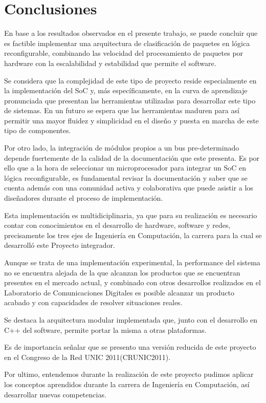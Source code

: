 \chapter{Conclusiones}


En base a los resultados observados en el presente trabajo, se puede concluir que es factible implementar una arquitectura de clasificación de paquetes en lógica reconfigurable, combinando las velocidad del procesamiento de paquetes por hardware con la escalabilidad y estabilidad que permite el software. 

Se considera que la complejidad de este tipo de proyecto reside especialmente en la implementación del SoC y, más específicamente, en la curva de aprendizaje pronunciada que presentan las herramientas utilizadas para desarrollar este tipo de sistemas. En un futuro se espera que las herramientas maduren para así permitir una mayor fluidez y simplicidad en el diseño y puesta en marcha de este tipo de componentes. 

Por otro lado, la integración de módulos propios a un bus pre-determinado depende fuertemente de la calidad de la documentación que este presenta. Es por ello que a la hora de seleccionar un microprocesador para integrar un SoC en lógica reconfigurable, es fundamental revisar la documentación y saber que se cuenta además con una comunidad activa y colaborativa que puede asistir a los diseñadores durante el proceso de implementación. 

Esta implementación es multidiciplinaria, ya que para su realización es necesario contar con conocimientos en el desarrollo de hardware, software y  redes, precisamente los tres ejes de Ingeniería en Computación, la carrera para la cual se desarrolló este Proyecto integrador. 

Aunque se trata de una implementación experimental, la performance del sistema no se encuentra alejada de la que alcanzan los productos que se encuentran presentes en el mercado actual, y combinado con otros desarrollos realizados en el Laboratorio de Comunicaciones Digitales es posible alcanzar un producto acabado y con capacidades de resolver situaciones reales.

Se destaca la arquitectura modular implementada que, junto con el desarrollo en C++ del software, permite portar la misma a otras plataformas.

Es de importancia señalar que se presento una versión reducida de este proyecto en el Congreso de la Red UNIC 2011(CRUNIC2011).

Por ultimo, entendemos durante la realización de este proyecto pudimos aplicar los conceptos aprendidos durante la carrera de Ingeniería en Computación, así  desarrollar nuevas competencias. 



